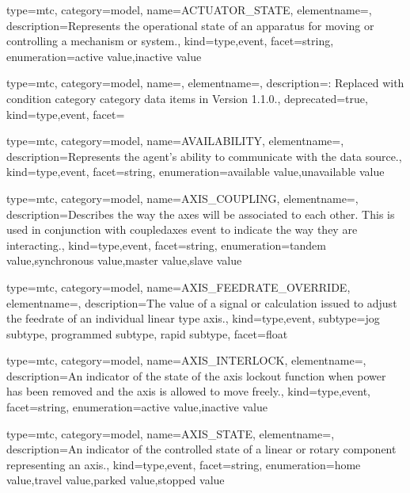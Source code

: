 {
  type=mtc,
  category=model,
  name={ACTUATOR\_STATE},
  elementname=,
  description={Represents the operational state of an apparatus for moving or controlling a mechanism or system.},
  kind={type,event},
  facet={\gls{string}},
  enumeration={\gls{active value},\gls{inactive value}}
}


{
  type=mtc,
  category=model,
  name=,
  elementname=,
  description={\DEPRECATED: Replaced with \gls{condition category} category data items in Version 1.1.0.},
  deprecated={true},
  kind={type,event},
  facet={}
}


{
  type=mtc,
  category=model,
  name={AVAILABILITY},
  elementname=,
  description={Represents the \gls{agent}'s ability to communicate with the data source.},
  kind={type,event},
  facet={\gls{string}},
  enumeration={\gls{available value},\gls{unavailable value}}
}


{
  type=mtc,
  category=model,
  name={AXIS\_COUPLING},
  elementname=,
  description={Describes the way the axes will be associated to each other. 
  \newline This is used in conjunction with \gls{coupledaxes event} to indicate the way they are interacting.},
  kind={type,event},
  facet={\gls{string}},
  enumeration={\gls{tandem value},\gls{synchronous value},\gls{master value},\gls{slave value}}
}


{
  type=mtc,
  category=model,
  name={AXIS\_FEEDRATE\_OVERRIDE},
  elementname=,
  description={The value of a signal or calculation issued to adjust the feedrate of an individual linear type axis.},
  kind={type,event},
  subtype={\gls{jog subtype}, \gls{programmed subtype}, \gls{rapid subtype}},
  facet={\gls{float}}
}



{
  type=mtc,
  category=model,
  name={AXIS\_INTERLOCK},
  elementname=,
  description={An indicator of the state of the axis lockout function when power has been removed and the axis is allowed to move freely.},
  kind={type,event},
  facet={\gls{string}},
  enumeration={\gls{active value},\gls{inactive value}}
}


{
  type=mtc,
  category=model,
  name={AXIS\_STATE},
  elementname=,
  description={An indicator of the controlled state of a \gls{linear} or \gls{rotary} component representing an axis.},
  kind={type,event},
  facet={\gls{string}},
  enumeration={\gls{home value},\gls{travel value},\gls{parked value},\gls{stopped value}}
}


